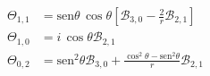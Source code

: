 \begin{minipage}{.5\textwidth}
\begin{align*}
\Theta_{1,1}&=\text{sen}\theta\,\cos\theta\left[\mathcal{B}_{3,0}-\frac{2}{r}\mathcal{B}_{2,1}\right]\\
\Theta_{1,0}&=i\,\cos\theta\mathcal{B}_{2,1}\\
\Theta_{0,2}&=\text{sen}^2\theta\mathcal{B}_{3,0}+\frac{\cos^2\theta-\text{sen}^2\theta}{r}\mathcal{B}_{2,1}
\end{align*}
\end{minipage}





